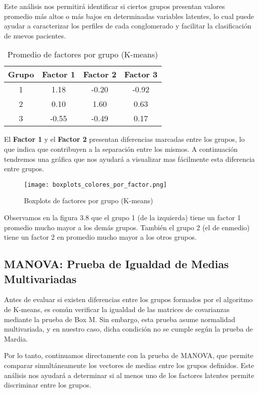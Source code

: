 \documentclass[12pt]{report}
\begin{document}
Este análisis nos permitirá identificar si ciertos grupos presentan valores promedio más altos o más bajos en determinadas variables latentes, lo cual puede ayudar a caracterizar los perfiles de cada conglomerado y facilitar la clasificación de nuevos pacientes.

\begin{table}[H]
\centering
\begin{tabular}{|c|c|c|c|}
\hline
\textbf{Grupo} & \textbf{Factor 1} & \textbf{Factor 2} & \textbf{Factor 3} \\
\hline
1 & 1.18 & -0.20 & -0.92 \\
2 & 0.10 &  1.60 &  0.63 \\
3 & -0.55 & -0.49 &  0.17 \\
\hline
\end{tabular}
\caption{Promedio de factores por grupo (K-means)}
\end{table}

\noindent El \textbf{Factor 1} y el \textbf{Factor 2} presentan diferencias marcadas entre los grupos, lo que indica que contribuyen a la separación entre los mismos. A continuación tendremos una gráfica que nos ayudará a visualizar mas fácilmente esta diferencia entre grupos.

\begin{figure}[H]
    \centering
    \texttt{[image: boxplots\_colores\_por\_factor.png]}
    \caption{Boxplots de factores por grupo (K-means)}
\end{figure}
Observamos en la figura 3.8 que el grupo 1 (de la izquierda) tiene un factor 1 promedio mucho mayor a los demás grupos. También el grupo 2 (el de enmedio) tiene un factor 2 en promedio mucho mayor a los otros grupos.
\newpage
\subsection{MANOVA: Prueba de Igualdad de Medias Multivariadas}

Antes de evaluar si existen diferencias entre los grupos formados por el algoritmo de K-means, es común verificar la igualdad de las matrices de covarianzas mediante la prueba de Box M. Sin embargo, esta prueba asume normalidad multivariada, y en nuestro caso, dicha condición no se cumple según la prueba de Mardia.

Por lo tanto, continuamos directamente con la prueba de MANOVA, que permite comparar simultáneamente los vectores de medias entre los grupos definidos. Este análisis nos ayudará a determinar si al menos uno de los factores latentes permite discriminar entre los grupos.
\end{document}
